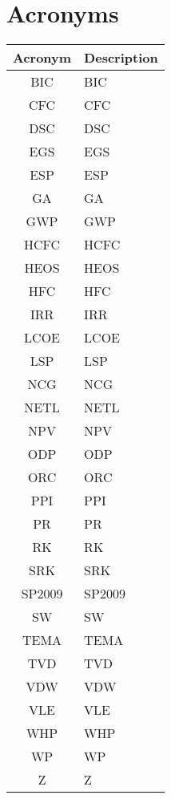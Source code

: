 \section*{Acronyms}
        \begin{longtable}{  c|p{10cm}}
        \hline
        \rowcolor{bluepoli!40}\textbf{Acronym} & \textbf{Description} \T\B \\
        \hline  \hline
        \endhead
        \ac{BIC} & \acf{BIC}  \\[2px]
        \ac{CFC} & \acf{CFC}  \\[2px]
        \ac{DSC} & \acf{DSC}  \\[2px]
        \ac{EGS} & \acf{EGS} \\[2px]
        \ac{ESP} & \acf{ESP} \\[2px]
        \ac{GA} & \acf{GA} \\[2px]
        \ac{GWP} & \acf{GWP} \\[2px]
        \ac{HCFC} & \acf{HCFC} \\[2px]
        \ac{HEOS} & \acf{HEOS} \\[2px]
        \ac{HFC} & \acf{HFC} \\[2px]
        \ac{IRR} & \acf{IRR} \\[2px]
        \ac{LCOE} & \acf{LCOE} \\[2px]
        \ac{LSP} & \acf{LSP} \\[2px]
        \ac{NCG} & \acf{NCG} \\[2px]
        \ac{NETL} & \acf{NETL} \\[2px]
        \ac{NPV} & \acf{NPV} \\[2px]
        \ac{ODP} & \acf{ODP} \\[2px]
        \ac{ORC} & \acf{ORC} \\[2px]
        \ac{PPI} & \acf{PPI} \\[2px]
        \ac{PR} & \acf{PR} \\[2px]
        \ac{RK} & \acf{RK} \\[2px]
        \ac{SRK} & \acf{SRK} \\[2px]
        \ac{SP2009} & \acf{SP2009} \\[2px]
        \ac{SW} & \acf{SW} \\[2px]
        \ac{TEMA} & \acf{TEMA} \\[2px]
        \ac{TVD} & \acf{TVD} \\[2px]
        \ac{VDW} & \acf{VDW} \\[2px]
        \ac{VLE} & \acf{VLE} \\[2px]
        \ac{WHP} & \acf{WHP} \\[2px]
        \ac{WP} & \acf{WP} \\[2px]
        \ac{Z} & \acf{Z} \\[2px]
    \end{longtable}

